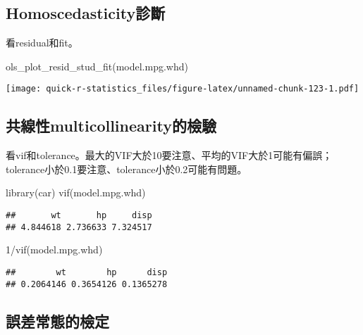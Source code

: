 \documentclass[
]{book}
\newenvironment{Shaded}{\begin{snugshade}}{\end{snugshade}}
\newcommand{\DecValTok}[1]{\textcolor[rgb]{0.00,0.00,0.81}{#1}}
\newcommand{\FunctionTok}[1]{\textcolor[rgb]{0.00,0.00,0.00}{#1}}
\newcommand{\NormalTok}[1]{#1}
\newcommand{\SpecialCharTok}[1]{\textcolor[rgb]{0.00,0.00,0.00}{#1}}
\begin{document}
\hypertarget{homoscedasticityux8a3aux65b7}{%
\subsection{Homoscedasticity診斷}\label{homoscedasticityux8a3aux65b7}}

看residual和fit。

\begin{Shaded}
\begin{Highlighting}[]
\FunctionTok{ols\_plot\_resid\_stud\_fit}\NormalTok{(model.mpg.whd)}
\end{Highlighting}
\end{Shaded}

\texttt{[image: quick-r-statistics\_files/figure-latex/unnamed-chunk-123-1.pdf]}

\hypertarget{ux5171ux7ddaux6027multicollinearityux7684ux6aa2ux9a57}{%
\subsection{共線性multicollinearity的檢驗}\label{ux5171ux7ddaux6027multicollinearityux7684ux6aa2ux9a57}}

看vif和tolerance。最大的VIF大於10要注意、平均的VIF大於1可能有偏誤；tolerance小於0.1要注意、tolerance小於0.2可能有問題。

\begin{Shaded}
\begin{Highlighting}[]
\FunctionTok{library}\NormalTok{(car)}
\FunctionTok{vif}\NormalTok{(model.mpg.whd)}
\end{Highlighting}
\end{Shaded}

\begin{verbatim}
##       wt       hp     disp 
## 4.844618 2.736633 7.324517
\end{verbatim}

\begin{Shaded}
\begin{Highlighting}[]
\DecValTok{1}\SpecialCharTok{/}\FunctionTok{vif}\NormalTok{(model.mpg.whd)}
\end{Highlighting}
\end{Shaded}

\begin{verbatim}
##        wt        hp      disp 
## 0.2064146 0.3654126 0.1365278
\end{verbatim}

\hypertarget{ux8aa4ux5deeux5e38ux614bux7684ux6aa2ux5b9a}{%
\subsection{誤差常態的檢定}\label{ux8aa4ux5deeux5e38ux614bux7684ux6aa2ux5b9a}}
\end{document}
